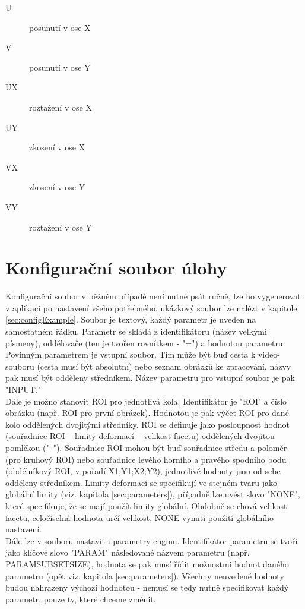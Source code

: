 \documentclass[a4paper,12pt]{article}
\begin{document}
\begin{description}
\begin{description}
\item[U] posunutí v ose X
\item[V] posunutí v ose Y
\item[UX] roztažení v ose X
\item[UY] zkosení v ose X
\item[VX] zkosení v ose Y
\item[VY] roztažení v ose Y
\end{description}
\end{description}
\newpage
\section{Konfigurační soubor úlohy}
\label{sec:config}
Konfigurační soubor v běžném případě není nutné psát ručně, lze ho vygenerovat v aplikaci po nastavení všeho potřebného, ukázkový soubor lze nalézt v kapitole \ref{sec:configExample}. Soubor je textový, každý parametr je uveden na samostatném řádku. Parametr se skládá z identifikátoru (název velkými písmeny), oddělovače (ten je tvořen rovnítkem - "=") a hodnotou parametru.\\
Povinným parametrem je vstupní soubor. Tím může být buď cesta k video-souboru (cesta musí být absolutní) nebo seznam obrázků ke zpracování, názvy pak musí být odděleny středníkem. Název parametru pro vstupní soubor je pak "INPUT."\\
Dále je možno stanovit ROI pro jednotlivá kola. Identifikátor je "ROI\textunderscore " a číslo obrázku (např. ROI pro první obrázek). Hodnotou je pak výčet ROI pro dané kolo oddělených dvojitými středníky. ROI se definuje jako posloupnost hodnot (souřadnice ROI -- limity deformací -- velikost facetu) oddělených dvojitou pomlčkou ("--"). Souřadnice ROI mohou být buď souřadnice středu a poloměr (pro kruhový ROI) nebo souřadnice levého horního a pravého spodního bodu (obdélníkový ROI, v pořadí X1;Y1;X2;Y2), jednotlivé hodnoty jsou od sebe odděleny středníkem. Limity deformací se specifikují ve stejném tvaru jako globální limity (viz. kapitola \ref{sec:parameters}), případně lze uvést slovo "NONE", které specifikuje, že se mají použít limity globální. Obdobně se chová velikost facetu, celočíselná hodnota určí velikost, NONE vynutí použití globálního nastavení.\\
Dále lze v souboru nastavit i parametry enginu. Identifikátor parametru se tvoří jako klíčové slovo "PARAM\textunderscore" následované názvem parametru (např. PARAM\textunderscore SUBSET\textunderscore SIZE), hodnota se pak musí řídit možnostmi hodnot daného parametru (opět viz. kapitola \ref{sec:parameters}). Všechny neuvedené hodnoty budou nahrazeny výchozí hodnotou - nemusí se tedy nutně specifikovat každý parametr, pouze ty, které chceme změnit.\\
\end{document}

